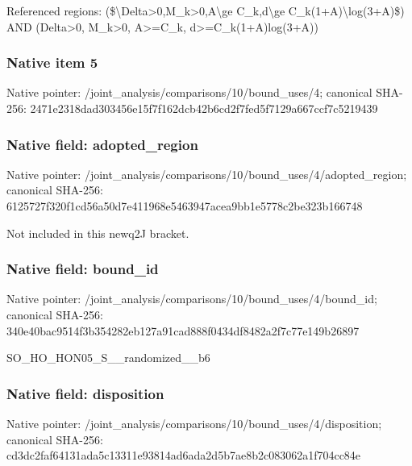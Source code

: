 \documentclass[10pt,a4paper]{article}
\begin{document}
\begingroup\raggedright\sloppy Referenced regions:\allowbreak{} (\$\textbackslash{}Delta>0,\allowbreak{}M\_\allowbreak{}k>0,\allowbreak{}A\textbackslash{}ge C\_\allowbreak{}k,\allowbreak{}d\textbackslash{}ge C\_\allowbreak{}k(1+A)\textbackslash{}log(3+A)\$) AND (Delta>0,\allowbreak{} M\_\allowbreak{}k>0,\allowbreak{} A>=\allowbreak{}C\_\allowbreak{}k,\allowbreak{} d>=\allowbreak{}C\_\allowbreak{}k(1+A)log(3+A))\par\endgroup

\subsubsection{Native item 5}
Native pointer: /joint\_\allowbreak{}analysis/comparisons/10/bound\_\allowbreak{}uses/4; canonical SHA-256: 2471e2318dad303456e15f7f162dcb42b6cd2f7fed5f7129a667ccf7c5219439

\subsubsection{Native field: adopted\_\allowbreak{}region}
Native pointer: /joint\_\allowbreak{}analysis/comparisons/10/bound\_\allowbreak{}uses/4/adopted\_\allowbreak{}region; canonical SHA-256: 6125727f320f1cd56a50d7e411968e5463947acea9bb1e5778c2be323b166748

\begingroup\raggedright\sloppy Not included in this newq2J bracket.\par\endgroup

\subsubsection{Native field: bound\_\allowbreak{}id}
Native pointer: /joint\_\allowbreak{}analysis/comparisons/10/bound\_\allowbreak{}uses/4/bound\_\allowbreak{}id; canonical SHA-256: 340e40bac9514f3b354282eb127a91cad888f0434df8482a2f7c77e149b26897

\begingroup\raggedright\sloppy SO\_\allowbreak{}HO\_\allowbreak{}HON05\_\allowbreak{}S\_\allowbreak{}\_\allowbreak{}randomized\_\allowbreak{}\_\allowbreak{}b6\par\endgroup

\subsubsection{Native field: disposition}
Native pointer: /joint\_\allowbreak{}analysis/comparisons/10/bound\_\allowbreak{}uses/4/disposition; canonical SHA-256: cd3dc2faf64131ada5c13311e93814ad6ada2d5b7ae8b2c083062a1f704cc84e
\end{document}

